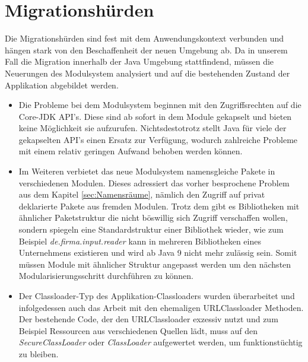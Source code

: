 \section{Migrationshürden}
	Die Migrationshürden sind fest mit dem Anwendungskontext verbunden und hängen stark von den Beschaffenheit der neuen Umgebung ab. Da in unserem Fall die Migration innerhalb der Java Umgebung stattfindend, müssen die Neuerungen des Modulsystem analysiert und auf die bestehenden Zustand der Applikation abgebildet werden.\bigbreak

\begin{itemize}


	\item Die Probleme bei dem Modulsystem beginnen mit den Zugriffsrechten auf die Core-JDK API's. Diese sind ab sofort in dem Module gekapselt und bieten keine Möglichkeit sie aufzurufen. Nichtsdestotrotz stellt Java für viele der gekapselten API's einen Ersatz zur Verfügung, wodurch zahlreiche Probleme mit einem relativ geringen Aufwand behoben werden können. 


	\item Im Weiteren verbietet das neue Modulsystem namensgleiche Pakete in verschiedenen Modulen. Dieses adressiert das vorher besprochene Problem aus dem Kapitel \ref{sec:Namensräume}, nämlich den Zugriff auf privat deklarierte Pakete aus fremden Modulen. Trotz dem gibt es Bibliotheken mit ähnlicher Paketstruktur die nicht böswillig sich Zugriff verschaffen wollen, sondern spiegeln eine Standardstruktur einer Bibliothek wieder, wie zum Beispiel \textit{de.firma.input.reader} kann in mehreren Bibliotheken eines Unternehmens existieren und wird ab Java 9 nicht mehr zulässig sein. Somit müssen Module mit ähnlicher Struktur angepasst werden um den nächsten Modularisierungsschritt durchführen zu können.


	\item Der Classloader-Typ des Applikation-Classloaders wurden überarbeitet und infolgedessen auch das Arbeit mit den ehemaligen URLClassloader Methoden. Der bestehende Code, der den URLClassloader exzessiv nutzt und zum Beispiel Ressourcen aus verschiedenen Quellen lädt, muss auf den \textit{SecureClassLoader} oder  \textit{ClassLoader} aufgewertet werden, um funktionstüchtig zu bleiben. 



\end{itemize}
